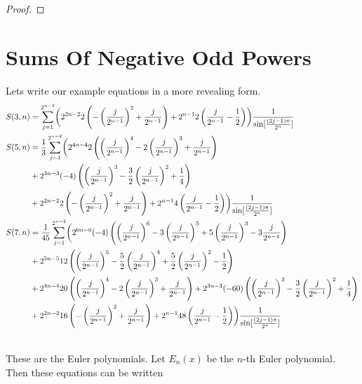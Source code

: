 \documentclass[fleqn,a4paper,9pt]{article}
\begin{document}
\begin{flushleft}
\begin{proof}
\end{proof}


\section{Sums Of Negative Odd Powers}

Lets write our example equations in a more revealing form.
\begin{align}\notag
S(3,n)&=\sum_{j=1}^{2^{n-2}}\biggl(2^{2n-2} 2\left(-\left(\frac{j}{2^{n-1}}\right)^2+\frac{j}{2^{n-1}} \right) +2^{n-1} 2\left(\frac{j}{2^{n-1}}-\frac{1}{2}\right)\biggr)\frac{1}{\sin[\frac{(2j-1)\pi}{2^n}]}\\\notag
S(5,n)&=\frac{1}{3}\sum_{j=1}^{2^{n-2}} \biggl(2^{4n-4}2\left(  \left(\frac{j}{2^{n-1}}\right)^4   -2\left(\frac{j}{2^{n-1}}\right)^3   +\frac{j}{2^{n-1}}   \right)\\\notag
&+2^{3n-3}(-4)\left(  \left(\frac{j}{2^{n-1}}\right)^3  -\frac{3}{2}\left(\frac{j}{2^{n-1}}\right)^2  +\frac{1}{4}  \right)\\\notag
&+2^{2n-2} 2\left(  -\left(\frac{j}{2^{n-1}}\right)^2  +\frac{j}{2^{n-1}}\right)+2^{n-1} 4\left(\frac{j}{2^{n-1}}-\frac{1}{2}\right)  \biggr)\frac{1}{\sin[\frac{(2j-1)\pi}{2^n}]}\\\notag
S(7,n)&=\frac{1}{45}\sum_{j=1}^{2^{n-2}}\biggl(2^{6n-6}  (-4)\left(   \left( \frac{j}{2^{n-1}}\right)^6-3\left(\frac{j}{2^{n-1}}\right)^5+5\left(\frac{j}{2^{n-1}}\right)^3-3\frac{j}{2^{n-1}}  \right)\\\notag
&+2^{5n-5}12\left(   \left( \frac{j}{2^{n-1}}\right)^5-\frac{5}{2}\left( \frac{j}{2^{n-1}}\right)^4+\frac{5}{2}\left( \frac{j}{2^{n-1}}\right)^2-\frac{1}{2}\right) \\\notag
&+2^{4n-4}20\left(  \left(\frac{j}{2^{n-1}}\right)^4   -2\left(\frac{j}{2^{n-1}}\right)^3   +\frac{j}{2^{n-1}}   \right)+2^{3n-3}(-60)\left(  \left(\frac{j}{2^{n-1}}\right)^3  -\frac{3}{2}\left(\frac{j}{2^{n-1}}\right)^2  +\frac{1}{4}  \right)\\\notag
&+2^{2n-2} 16\left(  -\left(\frac{j}{2^{n-1}}\right)^2  +\frac{j}{2^{n-1}}\right)+2^{n-1} 48\left(\frac{j}{2^{n-1}}-\frac{1}{2}\right)  \biggr)\frac{1}{\sin[\frac{(2j-1)\pi}{2^n}]}\\\notag
\end{align}

These are the Euler polynomials. Let $E_n(x)$ be the $n$-th Euler polynomial. Then these equations can be written


\end{flushleft}
\end{document}
